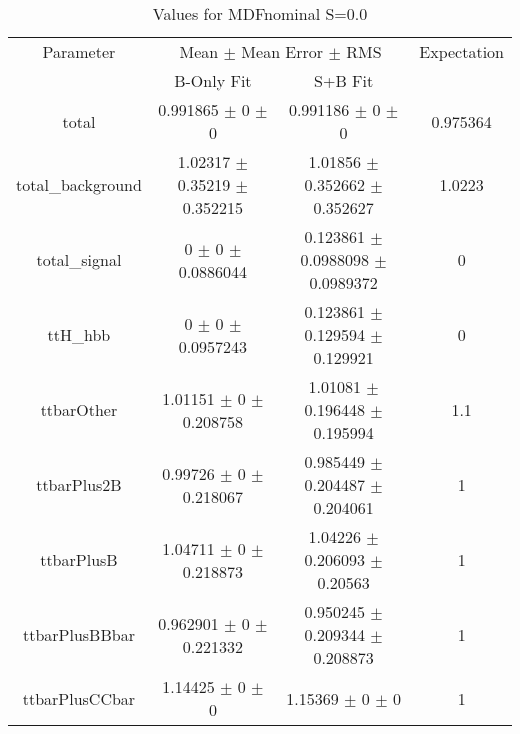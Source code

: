 \begin{table}
\centering
\caption{Values for MDFnominal S=0.0}
\begin{tabular}{cccc}
\toprule
Parameter & \multicolumn{2}{c}{Mean $\pm$ Mean Error $\pm$ RMS} & Expectation\\
 & B-Only Fit & S+B Fit & \\
\midrule
total & \num{0.991865} $\pm$ \num{0} $\pm$ \num{0} & \num{0.991186} $\pm$ \num{0} $\pm$ \num{0} & \num{0.975364}\\
total\_background & \num{1.02317} $\pm$ \num{0.35219} $\pm$ \num{0.352215} & \num{1.01856} $\pm$ \num{0.352662} $\pm$ \num{0.352627} & \num{1.0223}\\
total\_signal & \num{0} $\pm$ \num{0} $\pm$ \num{0.0886044} & \num{0.123861} $\pm$ \num{0.0988098} $\pm$ \num{0.0989372} & \num{0}\\
ttH\_hbb & \num{0} $\pm$ \num{0} $\pm$ \num{0.0957243} & \num{0.123861} $\pm$ \num{0.129594} $\pm$ \num{0.129921} & \num{0}\\
ttbarOther & \num{1.01151} $\pm$ \num{0} $\pm$ \num{0.208758} & \num{1.01081} $\pm$ \num{0.196448} $\pm$ \num{0.195994} & \num{1.1}\\
ttbarPlus2B & \num{0.99726} $\pm$ \num{0} $\pm$ \num{0.218067} & \num{0.985449} $\pm$ \num{0.204487} $\pm$ \num{0.204061} & \num{1}\\
ttbarPlusB & \num{1.04711} $\pm$ \num{0} $\pm$ \num{0.218873} & \num{1.04226} $\pm$ \num{0.206093} $\pm$ \num{0.20563} & \num{1}\\
ttbarPlusBBbar & \num{0.962901} $\pm$ \num{0} $\pm$ \num{0.221332} & \num{0.950245} $\pm$ \num{0.209344} $\pm$ \num{0.208873} & \num{1}\\
ttbarPlusCCbar & \num{1.14425} $\pm$ \num{0} $\pm$ \num{0} & \num{1.15369} $\pm$ \num{0} $\pm$ \num{0} & \num{1}\\
\bottomrule
\end{tabular}
\end{table}